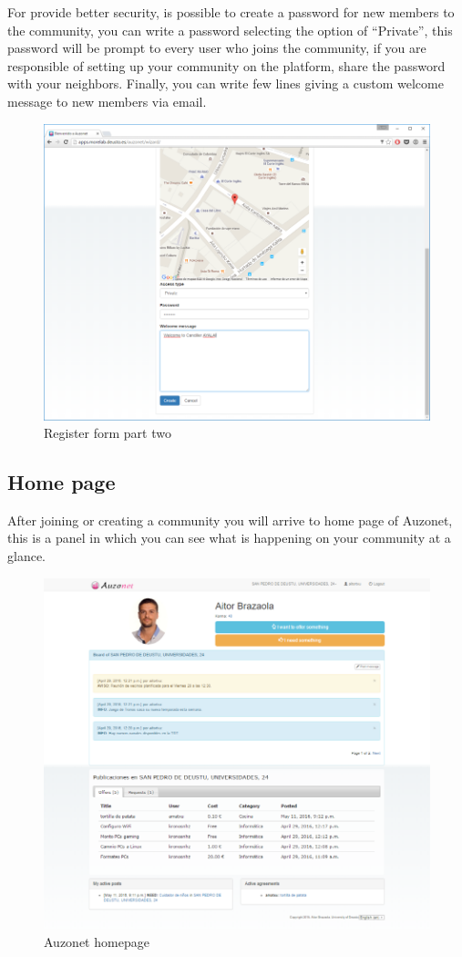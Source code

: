 \documentclass{DeustoFDP}
\begin{document}
For provide better security, is possible to create a password for new members to the community, you can write a password selecting the option of “Private”, this password will be prompt to every user who joins the community, if you are responsible of setting up your community on the platform, share the password with your neighbors.
Finally, you can write few lines giving a custom welcome message to new members via email.
\begin{figure}[h!]
\centering
\includegraphics[width=0.9\linewidth]{fig/Manual/address2}
\caption[Register form part two]{Register form part two}
\label{fig:address2}
\end{figure}

\newpage
\subsection{Home page}
After joining or creating a community you will arrive to home page of Auzonet, this is a panel in which you can see what is happening on your community at a glance.
\begin{figure}[h!]
\centering
\includegraphics[width=0.9\linewidth]{fig/Manual/home}
\caption[Auzonet homepage]{Auzonet homepage}
\label{fig:home}
\end{figure}
\end{document}
